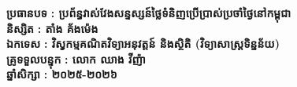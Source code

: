 \begin{mdframed}[linewidth=1.5pt, roundcorner=5pt]
\begin{center}
    \begin{flushleft}
        \hspace{1cm}
        \fontsize{12pt}{14pt}\selectfont \textbf{\khmerfontmoul ប្រធានបទ}
        \hspace{0.5cm}
        \fontsize{12pt}{14pt}\selectfont \textbf{\khmerfontmoul : ប្រព័ន្ធវាស់វែងសន្ទស្សន៍ថ្លៃទំនិញប្រើប្រាស់ប្រចាំថ្ងៃនៅកម្ពុជា}\\
        \hspace{1cm}
        \fontsize{12pt}{14pt}\selectfont \textbf{\khmerfontmoul និស្សិត} 
        \hspace{1.3cm}
        \fontsize{12pt}{14pt}\selectfont \textbf{\khmerfontmoul : តាំង គ័ងម៉េង} \\[.1cm]
        \hspace{1cm}
        \fontsize{12pt}{14pt}\selectfont \textbf{\khmerfontmoul ឯកទេស}
        \hspace{0.95cm}
        \fontsize{12pt}{14pt}\selectfont \textbf{\khmerfontmoul : វិស្វកម្មគណិតវិទ្យាអនុវត្តន៍ និងស្ថិតិ (វិទ្យាសាស្ត្រទិន្នន័យ)} \\[.1cm]
        \hspace{1cm}
        \fontsize{12pt}{14pt}\selectfont \textbf{\khmerfontmoul គ្រូទទួលបន្ទុក}
        \hspace{0.15cm}
        \fontsize{12pt}{14pt}\selectfont \textbf{\khmerfontmoul : លោក ឈាង វីញ៉ា} \\[.1cm]
        \hspace{1cm}
        \fontsize{12pt}{14pt}\selectfont \textbf{\khmerfontmoul ឆ្នាំសិក្សា}
        \hspace{1.05cm}
        \fontsize{12pt}{14pt}\selectfont \textbf{\khmerfontmoul : ២០២៥-២០២៦} \\
    \end{flushleft}
\end{center}

\vspace{0.1cm}
\noindent\makebox[\textwidth][c]{\rule{1.05\textwidth}{0.5pt}}


\end{mdframed}
